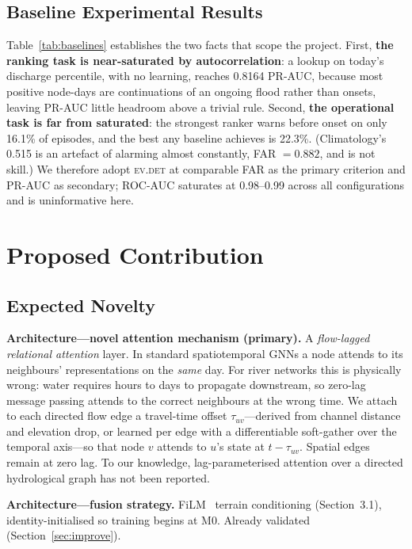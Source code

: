 \documentclass[sigconf]{acmart}
\begin{document}
\subsection{Baseline Experimental Results}
\label{sec:baseline}

Table~\ref{tab:baselines} establishes the two facts that scope the project. First, \textbf{the ranking task is near-saturated by autocorrelation}: a lookup on today's discharge percentile, with no learning, reaches 0.8164 PR-AUC, because most positive node-days are continuations of an ongoing flood rather than onsets, leaving PR-AUC little headroom above a trivial rule. Second, \textbf{the operational task is far from saturated}: the strongest ranker warns before onset on only 16.1\% of episodes, and the best any baseline achieves is 22.3\%. (Climatology's 0.515 is an artefact of alarming almost constantly, FAR $=0.882$, and is not skill.) We therefore adopt \textsc{ev.det} at comparable FAR as the primary criterion and PR-AUC as secondary; ROC-AUC saturates at 0.98--0.99 across all configurations and is uninformative here.

\section{Proposed Contribution}

\subsection{Expected Novelty}
\label{sec:novelty}

\textbf{Architecture---novel attention mechanism (primary).} A \emph{flow-lagged relational attention} layer. In standard spatiotemporal GNNs a node attends to its neighbours' representations on the \emph{same} day. For river networks this is physically wrong: water requires hours to days to propagate downstream, so zero-lag message passing attends to the correct neighbours at the wrong time. We attach to each directed flow edge a travel-time offset $\tau_{uv}$---derived from channel distance and elevation drop, or learned per edge with a differentiable soft-gather over the temporal axis---so that node $v$ attends to $u$'s state at $t-\tau_{uv}$. Spatial edges remain at zero lag. To our knowledge, lag-parameterised attention over a directed hydrological graph has not been reported.

\textbf{Architecture---fusion strategy.} FiLM~\cite{FiLM2018} terrain conditioning (Section~3.1), identity-initialised so training begins at M0. Already validated (Section~\ref{sec:improve}).
\end{document}
